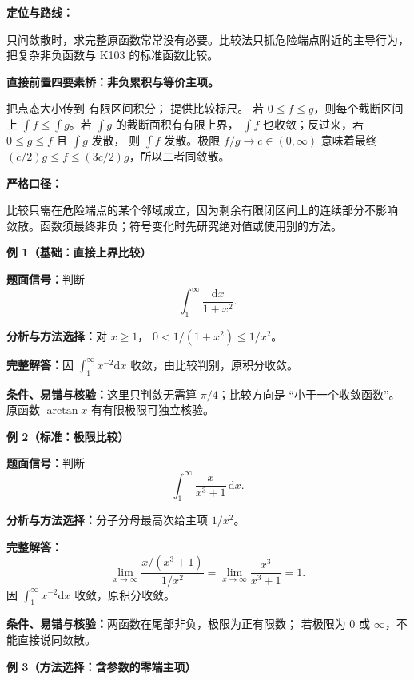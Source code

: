 \par

\begin{knowledgeBox}
\textbf{定位与路线：}

只问敛散时，求完整原函数常常没有必要。比较法只抓危险端点附近的主导行为，
把复杂非负函数与 K103 的标准函数比较。

\textbf{直接前置四要素桥：非负累积与等价主项。}

把点态大小传到
有限区间积分；
提供比较标尺。
若 \(0\le f\le g\)，则每个截断区间上
\(\int f\le\int g\)。若 \(\int g\) 的截断面积有有限上界，
\(\int f\) 也收敛；反过来，若 \(0\le g\le f\) 且 \(\int g\) 发散，
则 \(\int f\) 发散。极限 \(f/g\to c\in(0,\infty)\) 意味着最终
\((c/2)g\le f\le(3c/2)g\)，所以二者同敛散。

\textbf{严格口径：}

比较只需在危险端点的某个邻域成立，因为剩余有限闭区间上的连续部分不影响
敛散。函数须最终非负；符号变化时先研究绝对值或使用别的方法。

\textbf{例 1（基础：直接上界比较）}

\textbf{题面信号：}判断
\[
\int_1^\infty\frac{\mathrm dx}{1+x^2}.
\]

\textbf{分析与方法选择：}对 \(x\ge1\)，
\(0<1/(1+x^2)\le1/x^2\)。

\textbf{完整解答：}因
\(\int_1^\infty x^{-2}\mathrm dx\) 收敛，由比较判别，原积分收敛。

\textbf{条件、易错与核验：}这里只判敛无需算 \(\pi/4\)；比较方向是
“小于一个收敛函数”。原函数 \(\arctan x\) 有有限极限可独立核验。

\textbf{例 2（标准：极限比较）}

\textbf{题面信号：}判断
\[
\int_1^\infty\frac{x}{x^3+1}\,\mathrm dx.
\]

\textbf{分析与方法选择：}分子分母最高次给主项 \(1/x^2\)。

\textbf{完整解答：}
\[
\lim_{x\to\infty}
\frac{x/(x^3+1)}{1/x^2}
=\lim_{x\to\infty}\frac{x^3}{x^3+1}=1.
\]
因 \(\int_1^\infty x^{-2}\mathrm dx\) 收敛，原积分收敛。

\textbf{条件、易错与核验：}两函数在尾部非负，极限为正有限数；
若极限为 \(0\) 或 \(\infty\)，不能直接说同敛散。

\textbf{例 3（方法选择：含参数的零端主项）}


\end{knowledgeBox}
